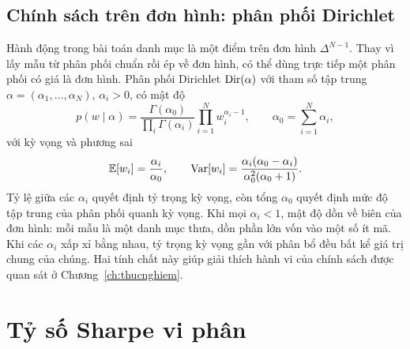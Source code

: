\subsection{Chính sách trên đơn hình: phân phối Dirichlet}
\label{sec:dirichlet}

Hành động trong bài toán danh mục là một điểm trên đơn hình $\Delta^{N-1}$. Thay vì lấy mẫu từ phân phối chuẩn rồi ép về đơn hình, có thể dùng trực tiếp một phân phối có giá là đơn hình. Phân phối Dirichlet $\operatorname{Dir}(\alpha)$ với tham số tập trung $\alpha=(\alpha_1,\dots,\alpha_N)$, $\alpha_i>0$, có mật độ
\begin{equation}
p(w\mid\alpha)=\frac{\Gamma(\alpha_0)}{\prod_{i}\Gamma(\alpha_i)}\prod_{i=1}^{N}w_i^{\alpha_i-1},\qquad \alpha_0=\sum_{i=1}^{N}\alpha_i,
\label{eq:dirichlet}
\end{equation}
với kỳ vọng và phương sai
\begin{equation}
\mathbb{E}[w_i]=\frac{\alpha_i}{\alpha_0},\qquad \operatorname{Var}[w_i]=\frac{\alpha_i(\alpha_0-\alpha_i)}{\alpha_0^2(\alpha_0+1)} .
\label{eq:dir-mean}
\end{equation}
Tỷ lệ giữa các $\alpha_i$ quyết định tỷ trọng kỳ vọng, còn tổng $\alpha_0$ quyết định mức độ tập trung của phân phối quanh kỳ vọng. Khi mọi $\alpha_i<1$, mật độ dồn về biên của đơn hình: mỗi mẫu là một danh mục thưa, dồn phần lớn vốn vào một số ít mã. Khi các $\alpha_i$ xấp xỉ bằng nhau, tỷ trọng kỳ vọng gần với phân bổ đều bất kể giá trị chung của chúng. Hai tính chất này giúp giải thích hành vi của chính sách được quan sát ở Chương~\ref{ch:thucnghiem}.

\section{Tỷ số Sharpe vi phân}
\label{sec:lt-dsr}

